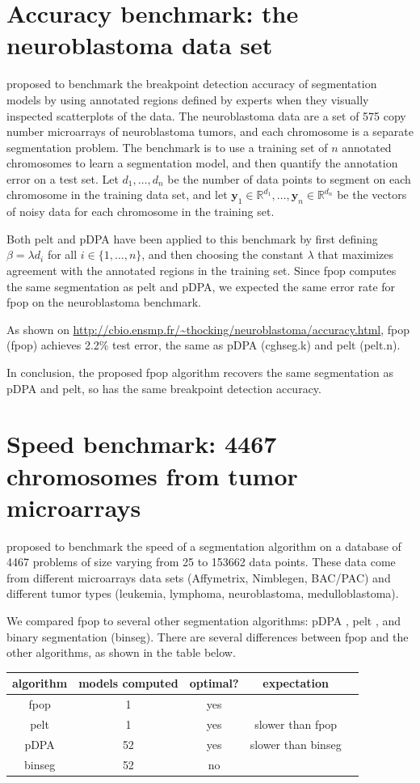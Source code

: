 \documentclass{article}
\newcommand{\RR}{\mathbb R}
\begin{document}
\section{Accuracy benchmark: the neuroblastoma data set}

\citet{HOCKING-breakpoints} proposed to benchmark the breakpoint
detection accuracy of segmentation models by using annotated regions
defined by experts when they visually inspected scatterplots of the
data. The neuroblastoma data are a set of 575 copy number microarrays
of neuroblastoma tumors, and each chromosome is a separate
segmentation problem. The benchmark is to use a training set of $n$
annotated chromosomes to learn a segmentation model, and then quantify
the annotation error on a test set. Let $d_1, \dots, d_n$ be the
number of data points to segment on each chromosome in the training
data set, and let $\mathbf y_1\in\RR^{d_1}, \dots, \mathbf
y_n\in\RR^{d_n}$ be the vectors of noisy data for each chromosome in
the training set.

Both pelt and pDPA have been applied to this benchmark by first
defining $\beta = \lambda d_i$ for all $i\in\{1, \dots, n\}$, and then
choosing the constant $\lambda$ that maximizes agreement with the
annotated regions in the training set. Since fpop computes the same
segmentation as pelt and pDPA, we expected the same error rate for
fpop on the neuroblastoma benchmark.

As shown on
\url{http://cbio.ensmp.fr/~thocking/neuroblastoma/accuracy.html}, fpop
(fpop) achieves 2.2\% test error, the same as pDPA (cghseg.k) and pelt
(pelt.n).

In conclusion, the proposed fpop algorithm recovers the same
segmentation as pDPA and pelt, so has the same breakpoint detection
accuracy.

\section{Speed benchmark: 4467 chromosomes from 
  tumor microarrays}

\citet{HOCKING-SegAnnDB} proposed to benchmark the speed of a
segmentation algorithm on a database of 4467 problems of size varying
from 25 to 153662 data points. These data come from different
microarrays data sets (Affymetrix, Nimblegen, BAC/PAC) and different
tumor types (leukemia, lymphoma, neuroblastoma, medulloblastoma).

We compared fpop to several other segmentation algorithms: pDPA
\citep{pruned-dp}, pelt \citep{pelt}, and binary segmentation
(binseg). There are several differences between fpop and the other
algorithms, as shown in the table below.
\begin{center}
  \begin{tabular}{ccccc}
    algorithm & models computed & optimal? & expectation\\
    \hline
    fpop & 1 & yes &                       \\
    pelt & 1 & yes & slower than fpop     \\
    pDPA & 52 & yes & slower than binseg  \\
    binseg & 52 & no & 
  \end{tabular}
\end{center}
\end{document}
